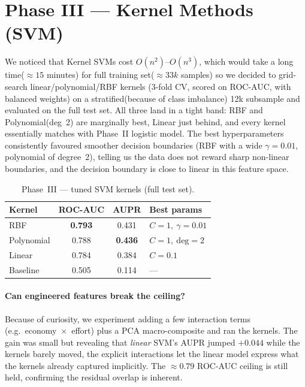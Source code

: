 \documentclass[11pt]{article}
\begin{document}
\section{Phase III --- Kernel Methods (SVM)} We noticed that Kernel SVMs cost $O(n^2)$--$O(n^3)$, which would take a long time($\approx 15$ minutes) for full training set($\approx 33k$ samples) so we decided to grid-search linear/polynomial/RBF kernels (3-fold CV,
scored on ROC-AUC, with balanced weights) on a stratified(because of class imbalance) 12k subsample and evaluated on the full test set. All three land in a tight band: RBF and Polynomial(deg~2) are marginally best, Linear just behind, and every kernel essentially matches with Phase~II logistic model. The best hyperparameters consistently favoured smoother decision boundaries (RBF with a wide $\gamma{=}0.01$, polynomial of degree~2), telling us the data does not reward sharp non-linear boundaries, and the decision boundary is close to linear in this feature space.

\begin{table}[H]
\centering\small
\caption{Phase~III --- tuned SVM kernels (full test set).}\label{tab:svm}
\begin{tabular}{lccl}
\toprule
Kernel & ROC-AUC & AUPR & Best params \\
\midrule
RBF        & \textbf{0.793} & 0.431 & $C{=}1,\ \gamma{=}0.01$ \\
Polynomial & 0.788 & \textbf{0.436} & $C{=}1,\ \mathrm{deg}{=}2$ \\
Linear     & 0.784 & 0.384 & $C{=}0.1$ \\
Baseline   & 0.505 & 0.114 & --- \\
\bottomrule
\end{tabular}
\end{table}


\paragraph{Can engineered features break the ceiling?} Because of curiosity, we experiment adding a few interaction terms (e.g.\ economy~$\times$~effort) plus a PCA macro-composite and ran the kernels. The gain was small but revealing that \emph{linear} SVM's AUPR jumped $+0.044$ while the kernels barely moved, the explicit
interactions let the linear model express what the kernels already captured implicitly. The
$\approx 0.79$ ROC-AUC ceiling is still held, confirming the residual overlap is inherent.
\end{document}
